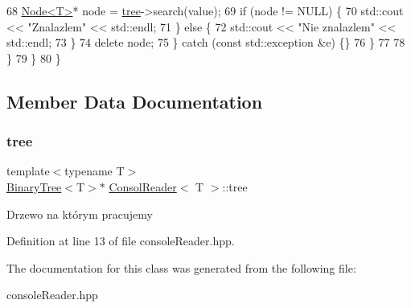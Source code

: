 \begin{DoxyCode}
68                             \hyperlink{classNode}{Node<T>}* node = \hyperlink{classConsolReader_a11228c385559fb0f4379b5f0c4fadef5}{tree}->search(value);
69                             \textcolor{keywordflow}{if} (node != NULL) \{
70                                 std::cout << \textcolor{stringliteral}{"Znalazlem"} << std::endl;
71                             \} \textcolor{keywordflow}{else} \{
72                                 std::cout << \textcolor{stringliteral}{"Nie znalazlem"} << std::endl;   
73                             \}
74                             \textcolor{keyword}{delete} node;
75                         \} \textcolor{keywordflow}{catch} (\textcolor{keyword}{const} std::exception &e) \{\}
76                     \}
77 
78                \}
79             \}
80         \}
\end{DoxyCode}


\subsection{Member Data Documentation}
\mbox{\label{classConsolReader_a11228c385559fb0f4379b5f0c4fadef5}} 
\subsubsection{\texorpdfstring{tree}{tree}}
{\footnotesize\ttfamily template$<$typename T$>$ \\
\hyperlink{classBinaryTree}{Binary\+Tree}$<$T$>$$\ast$ \hyperlink{classConsolReader}{Consol\+Reader}$<$ T $>$\+::tree\hspace{0.3cm}{\ttfamily [private]}}

Drzewo na którym pracujemy 

Definition at line 13 of file console\+Reader.\+hpp.



The documentation for this class was generated from the following file\+:\begin{DoxyCompactItemize}
\item 
console\+Reader.\+hpp\end{DoxyCompactItemize}
